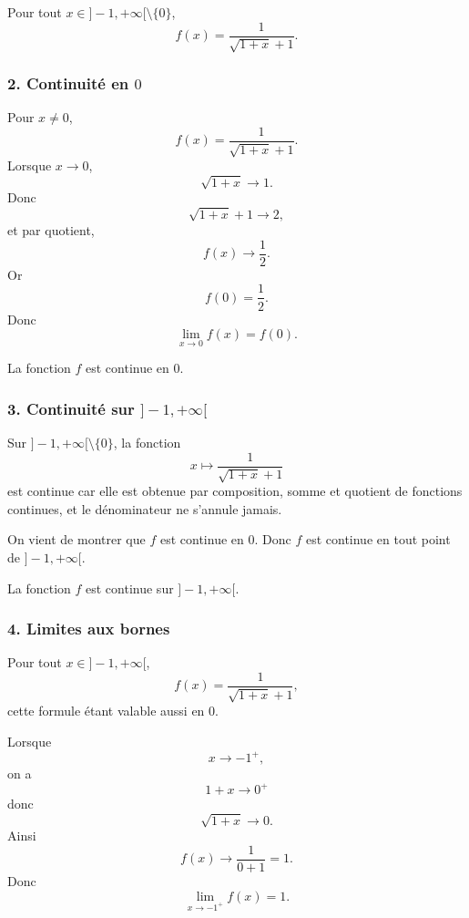 \documentclass[11pt,a4paper]{article}
\begin{document}
\begin{resultatbox}
Pour tout \(x\in]-1,+\infty[\setminus\{0\}\),
\[
f(x)=\frac1{\sqrt{1+x}+1}.
\]
\end{resultatbox}


\subsubsection*{2. Continuité en \(0\)}

Pour \(x\neq 0\),
\[
f(x)=\frac1{\sqrt{1+x}+1}.
\]
Lorsque \(x\to 0\),
\[
\sqrt{1+x}\to 1.
\]
Donc
\[
\sqrt{1+x}+1\to 2,
\]
et par quotient,
\[
f(x)\to \frac12.
\]
Or
\[
f(0)=\frac12.
\]
Donc
\[
\lim_{x\to 0}f(x)=f(0).
\]

\begin{resultatbox}
La fonction \(f\) est continue en \(0\).
\end{resultatbox}


\subsubsection*{3. Continuité sur \(]-1,+\infty[\)}

Sur \(]-1,+\infty[\setminus\{0\}\), la fonction
\[
x\mapsto \frac1{\sqrt{1+x}+1}
\]
est continue car elle est obtenue par composition, somme et quotient de fonctions continues, et le dénominateur ne s'annule jamais.

On vient de montrer que \(f\) est continue en \(0\). Donc \(f\) est continue en tout point de \(]-1,+\infty[\).

\begin{resultatbox}
La fonction \(f\) est continue sur \(]-1,+\infty[\).
\end{resultatbox}


\subsubsection*{4. Limites aux bornes}

Pour tout \(x\in]-1,+\infty[\),
\[
f(x)=\frac1{\sqrt{1+x}+1},
\]
cette formule étant valable aussi en \(0\).

Lorsque
\[
x\to -1^+,
\]
on a
\[
1+x\to 0^+
\]
donc
\[
\sqrt{1+x}\to 0.
\]
Ainsi
\[
f(x)\to \frac1{0+1}=1.
\]
Donc
\[
\lim_{x\to -1^+}f(x)=1.
\]
\end{document}
